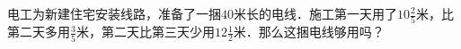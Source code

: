 
电工为新建住宅安装线路，准备了一捆$40$米长的电线．施工第一天用了$10\frac{2}{5}$米，比第二天多用$\frac{3}{5}$米，第二天比第三天少用$12\frac{1}{2}$米．那么这捆电线够用吗？\\

